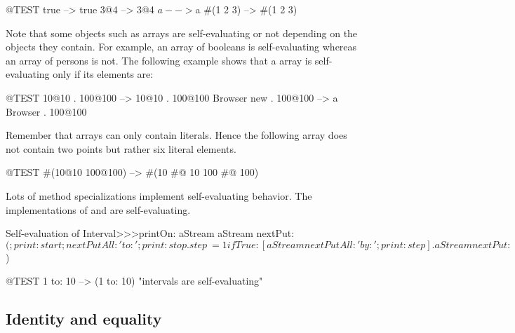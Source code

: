 \documentclass[a4paper,10pt,twoside]{book}
\begin{document}
\begin{code}{@TEST}
true       --> true
3@4     --> 3@4
$a         --> $a
#(1 2 3) --> #(1 2 3)
\end{code}

Note that some objects such as arrays are self-evaluating or not depending on the objects they contain.
For example, an array of booleans is self-evaluating whereas an array of persons is not.
The following example shows that a  array is self-evaluating only if its elements are:
\begin{code}{@TEST}
{10@10 . 100@100}          --> {10@10 . 100@100}
{Browser new . 100@100} --> {a Browser . 100@100}
\end{code}

Remember that  arrays can only contain literals.
Hence the following array does not contain two points but rather six literal elements.
\begin{code}{@TEST}
#(10@10 100@100) --> #(10 #@ 10 100 #@ 100)
\end{code}

Lots of  method specializations implement self-evaluating behavior.
The implementations of  and  are self-evaluating.


\begin{method}{Self-evaluation of }
Interval>>>printOn: aStream
    aStream nextPut: $(;
        print: start;
        nextPutAll: ' to: ';
        print: stop.
    step ~= 1 ifTrue: [aStream nextPutAll: ' by: '; print: step].
    aStream nextPut: $)
\end{method}

\begin{code}{@TEST}
1 to: 10 --> (1 to: 10)    "intervals are self-evaluating"
\end{code}

\subsection{Identity and equality}
\end{document}
